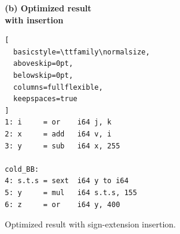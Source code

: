 \begin{figure}[H]
\centering
\begin{minipage}{0.64\textwidth}

\textbf{(b) Optimized result}\\[-0.2em]
\textbf{    with insertion}\\[0.05em]

\begin{lstlisting}[
  basicstyle=\ttfamily\normalsize,
  aboveskip=0pt,
  belowskip=0pt,
  columns=fullflexible,
  keepspaces=true
]
1: i     = or    i64 j, k
2: x     = add   i64 v, i
3: y     = sub   i64 x, 255

cold_BB:
4: s.t.s = sext  i64 y to i64
5: y     = mul   i64 s.t.s, 155
6: z     = or    i64 y, 400
\end{lstlisting}


\captionsetup{
  font=small,
  justification=centering,
  singlelinecheck=false,
  skip=0pt
}
\vspace{1.2em}

\caption{Optimized result with sign-extension insertion.}
\label{fig:figure5}

\end{minipage}

\end{figure}
